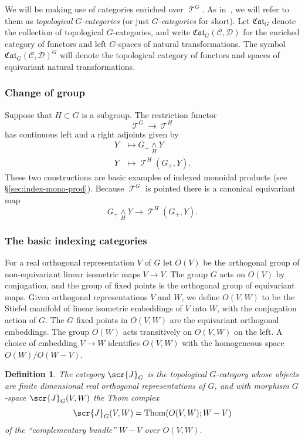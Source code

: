 \documentclass{amsart}
\newtheorem{definition}[equation]{Definition}
\newenvironment{defin}{\begin{definition}\rm}{\end{definition}}
\theoremstyle{definition}
\newtheorem{defin}[equation]{Definition}
\theoremstyle{remark}
\DeclareMathOperator{\spaces}{\mathcal T}
\newcommand{\smashove}[1]{\underset{#1}{\wedge}}
\DeclareMathOperator{\thom}{Thom}
\newcommand{\icat}{\scr{J}}
\newcommand{\igcat}[1]{\icat_{#1}}
\newcommand{\ugspaces}[1]{\spaces^{#1}}
\newcommand{\cat}[1]{{\mathcal #1}}
\newcommand{\gcat}[1]{\mathfrak{Cat}_{#1}}
\begin{document}
We will be making use of categories enriched over $\ugspaces{G}$.  As
in~\cite{MR1922205}, we will refer to them as {\em topological
$G$-categories} (or just {\em $G$-categories} for short).  Let $\gcat
G$ denote the collection of topological $G$-categories, and write
$\gcat G(\cat C, \cat D)$ for the enriched category of functors and
left $G$-spaces of natural transformations.  The symbol $\gcat G(\cat
C,\cat D)^{G}$ will denote the topological category of functors and
spaces of equivariant natural transformations.

\subsubsection{Change of group}
\label{sec:change-group-1}

Suppose that $H\subset G$ is a subgroup.  The restriction functor 
\[
\ugspaces{G}\to \ugspaces{H}
\]
has continuous left and a right adjoints given by
\begin{align*}
Y &\mapsto G_{+}\smashove{H} Y \\
Y &\mapsto \ugspaces{H}(G_{+},Y).
\end{align*}
These two constructions are basic examples of indexed monoidal
products (see \S\ref{sec:index-mono-prod}).  Because $\ugspaces{G}$ is
pointed there is a canonical equivariant map 
\[
G_{+}\smashove{H} Y \to \ugspaces{H}(G_{+},Y).
\]


\subsubsection{The basic indexing categories}
\label{sec:basic-index-categ}

For a real orthogonal representation $V$ of $G$ let $O(V)$ be the
orthogonal group of non-equivariant linear isometric maps $V\to V$.
The group $G$ acts on $O(V)$ by conjugation, and the group of fixed
points is the orthogonal group of equivariant maps.  Given orthogonal
representations $V$ and $W$, we define $O(V,W)$ to be the Stiefel
manifold of linear isometric embeddings of $V$ into $W$, with the
conjugation action of $G$.  The $G$ fixed points in $O(V,W)$ are the
equivariant orthogonal embeddings.  The group $O(W)$ acts transitively
on $O(V,W)$ on the left.  A choice of embedding $V\to W$ identifies
$O(V,W)$ with the homogeneous space $O(W)/O(W-V)$.

\begin{defin}
\label{def:37} The category $\igcat G$ is the topological $G$-category
whose objects are finite dimensional real orthogonal representations
of $G$,  and with morphism $G$-space $\igcat G(V,W)$ the Thom complex
\[
\igcat G(V,W)=\thom(O(V,W);W-V)
\]
of the ``complementary bundle'' $W-V$ over $O(V,W)$.   
\end{defin}
\end{document}
